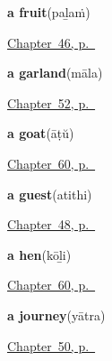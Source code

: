 \noindent\begin{minipage}[t]{\linewidth}
\raggedright
\textbf{a fruit}\enspace\emph{}\enspace(paḻaṁ)\par
\footnotesize \hyperref[ch:ml-ask-for]{Chapter~46, p.~\pageref*{ch:ml-ask-for}}
\end{minipage}\par\smallskip

\noindent\begin{minipage}[t]{\linewidth}
\raggedright
\textbf{a garland}\enspace\emph{}\enspace(māla)\par
\footnotesize \hyperref[ch:ml-welcoming-a-guest]{Chapter~52, p.~\pageref*{ch:ml-welcoming-a-guest}}
\end{minipage}\par\smallskip

\noindent\begin{minipage}[t]{\linewidth}
\raggedright
\textbf{a goat}\enspace\emph{}\enspace(āṭŭ)\par
\footnotesize \hyperref[ch:ml-animals-around-a-house]{Chapter~60, p.~\pageref*{ch:ml-animals-around-a-house}}
\end{minipage}\par\smallskip

\noindent\begin{minipage}[t]{\linewidth}
\raggedright
\textbf{a guest}\enspace\emph{}\enspace(atithi)\par
\footnotesize \hyperref[ch:ml-roles]{Chapter~48, p.~\pageref*{ch:ml-roles}}
\end{minipage}\par\smallskip

\noindent\begin{minipage}[t]{\linewidth}
\raggedright
\textbf{a hen}\enspace\emph{}\enspace(kōḻi)\par
\footnotesize \hyperref[ch:ml-animals-around-a-house]{Chapter~60, p.~\pageref*{ch:ml-animals-around-a-house}}
\end{minipage}\par\smallskip

\noindent\begin{minipage}[t]{\linewidth}
\raggedright
\textbf{a journey}\enspace\emph{}\enspace(yātra)\par
\footnotesize \hyperref[ch:ml-taking-leave]{Chapter~50, p.~\pageref*{ch:ml-taking-leave}}
\end{minipage}\par\smallskip

